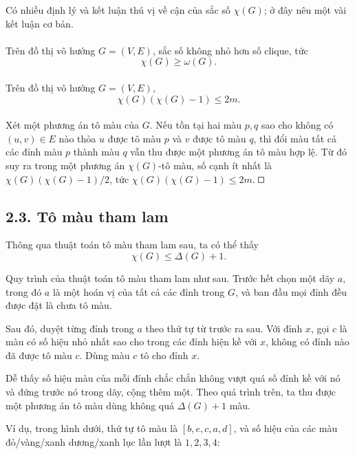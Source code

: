 \documentclass[11pt]{article}
\newcommand{\square}{\mathord{\vcenter{\hrule height .5pt
  \hbox{\vrule width .5pt height 5pt\kern5pt\vrule width .5pt}
  \hrule height .5pt}}}
\begin{document}
Có nhiều định lý và kết luận thú vị về cận của sắc số \(\chi(G)\); ở đây nêu
một vài kết luận cơ bản.

\paragraph{}
Trên đồ thị vô hướng \(G=(V,E)\), sắc số không nhỏ hơn số clique, tức
\[
  \chi(G)\ge \omega(G).
\]

\paragraph{}
Trên đồ thị vô hướng \(G=(V,E)\),
\[
  \chi(G)(\chi(G)-1)\le 2m.
\]

\paragraph{}
Xét một phương án tô màu của \(G\). Nếu tồn tại hai màu \(p,q\) sao cho không
có \((u,v)\in E\) nào thỏa \(u\) được tô màu \(p\) và \(v\) được tô màu \(q\),
thì đổi màu tất cả các đỉnh màu \(p\) thành màu \(q\) vẫn thu được một phương
án tô màu hợp lệ. Từ đó suy ra trong một phương án \(\chi(G)\)-tô màu, số cạnh
ít nhất là \(\chi(G)(\chi(G)-1)/2\), tức
\(\chi(G)(\chi(G)-1)\le 2m\). \(\square\)

\subsection*{2.3. Tô màu tham lam}

Thông qua thuật toán tô màu tham lam sau, ta có thể thấy
\[
  \chi(G)\le \Delta(G)+1.
\]

Quy trình của thuật toán tô màu tham lam như sau. Trước hết chọn một dãy
\(a\), trong đó \(a\) là một hoán vị của tất cả các đỉnh trong \(G\), và ban
đầu mọi đỉnh đều được đặt là chưa tô màu.

Sau đó, duyệt từng đỉnh trong \(a\) theo thứ tự từ trước ra sau. Với đỉnh
\(x\), gọi \(c\) là màu có số hiệu nhỏ nhất sao cho trong các đỉnh hiện kề với
\(x\), không có đỉnh nào đã được tô màu \(c\). Dùng màu \(c\) tô cho đỉnh
\(x\).

Dễ thấy số hiệu màu của mỗi đỉnh chắc chắn không vượt quá số đỉnh kề với nó
và đứng trước nó trong dãy, cộng thêm một. Theo quá trình trên, ta thu được
một phương án tô màu dùng không quá \(\Delta(G)+1\) màu.

Ví dụ, trong hình dưới, thứ tự tô màu là \([b,e,c,a,d]\), và số hiệu của các
màu đỏ/vàng/xanh dương/xanh lục lần lượt là \(1,2,3,4\):
\end{document}
